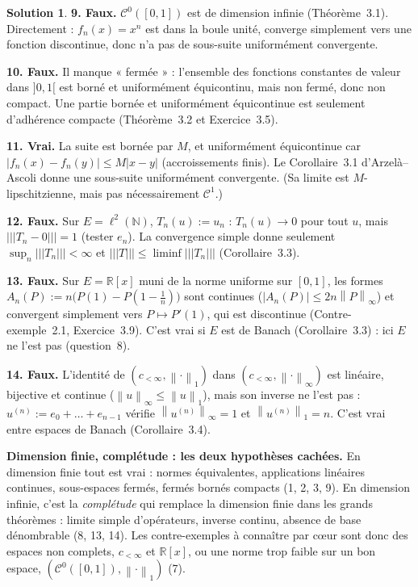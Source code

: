 \documentclass[11pt,a4paper]{article}
\newcommand{\R}{\mathbb{R}}
\newcommand{\N}{\mathbb{N}}
\newcommand{\norm}[1]{\left\|#1\right\|}
\newcommand{\opnorm}[1]{|\!|\!|#1|\!|\!|}
\newcommand{\Cz}{\mathcal{C}^0}
\theoremstyle{definition}
\newtheorem*{solution}{Solution}
\begin{document}
\begin{solution}
\medskip
\noindent\textbf{9. Faux.} $\Cz([0,1])$ est de dimension infinie (Théorème~3.1). Directement : $f_n(x)=x^n$ est dans la boule unité, converge simplement vers une fonction discontinue, donc n'a pas de sous-suite uniformément convergente.

\medskip
\noindent\textbf{10. Faux.} Il manque « fermée » : l'ensemble des fonctions constantes de valeur dans $]0,1[$ est borné et uniformément équicontinu, mais non fermé, donc non compact. Une partie bornée et uniformément équicontinue est seulement d'adhérence compacte (Théorème~3.2 et Exercice~3.5).

\medskip
\noindent\textbf{11. Vrai.} La suite est bornée par $M$, et uniformément équicontinue car $|f_n(x)-f_n(y)|\le M|x-y|$ (accroissements finis). Le Corollaire~3.1 d'Arzelà--Ascoli donne une sous-suite uniformément convergente. (Sa limite est $M$-lipschitzienne, mais pas nécessairement $\mathcal C^1$.)

\medskip
\noindent\textbf{12. Faux.} Sur $E=\ell^2(\N)$, $T_n(u):=u_n$ : $T_n(u)\to0$ pour tout $u$, mais $\opnorm{T_n-0}=1$ (tester $e_n$). La convergence simple donne seulement $\sup_n\opnorm{T_n}<\infty$ et $\opnorm T\le\liminf\opnorm{T_n}$ (Corollaire~3.3).

\medskip
\noindent\textbf{13. Faux.} Sur $E=\R[x]$ muni de la norme uniforme sur $[0,1]$, les formes $A_n(P):=n\big(P(1)-P(1-\frac1n)\big)$ sont continues ($|A_n(P)|\le2n\norm P_\infty$) et convergent simplement vers $P\mapsto P'(1)$, qui est discontinue (Contre-exemple~2.1, Exercice~3.9). C'est vrai si $E$ est de Banach (Corollaire~3.3) : ici $E$ ne l'est pas (question~8).

\medskip
\noindent\textbf{14. Faux.} L'identité de $(c_{<\infty},\norm\cdot_1)$ dans $(c_{<\infty},\norm\cdot_\infty)$ est linéaire, bijective et continue ($\norm u_\infty\le\norm u_1$), mais son inverse ne l'est pas : $u^{(n)}:=e_0+\dots+e_{n-1}$ vérifie $\norm{u^{(n)}}_\infty=1$ et $\norm{u^{(n)}}_1=n$. C'est vrai entre espaces de Banach (Corollaire~3.4).
\end{solution}

\begin{piege}
\textbf{Dimension finie, complétude : les deux hypothèses cachées.} En dimension finie tout est vrai : normes équivalentes, applications linéaires continues, sous-espaces fermés, fermés bornés compacts (1, 2, 3, 9). En dimension infinie, c'est la \emph{complétude} qui remplace la dimension finie dans les grands théorèmes : limite simple d'opérateurs, inverse continu, absence de base dénombrable (8, 13, 14). Les contre-exemples à connaître par cœur sont donc des espaces non complets, $c_{<\infty}$ et $\R[x]$, ou une norme trop faible sur un bon espace, $(\Cz([0,1]),\norm\cdot_1)$ (7).
\end{piege}
\end{document}
